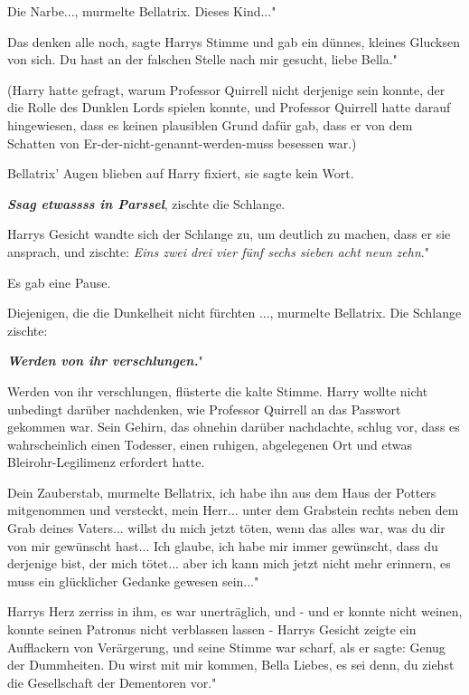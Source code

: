 \glqq{}Die Narbe...\grqq{}, murmelte Bellatrix. \glqq{}Dieses Kind..."

\glqq{}Das denken alle noch\grqq{}, sagte Harrys Stimme und gab ein dünnes,
kleines Glucksen von sich. \glqq{}Du hast an der falschen Stelle nach mir
gesucht, liebe Bella."

(Harry hatte gefragt, warum Professor Quirrell nicht derjenige sein konnte, der
die Rolle des Dunklen Lords spielen konnte, und Professor Quirrell hatte darauf
hingewiesen, dass es keinen plausiblen Grund dafür gab, dass er von dem Schatten
von Er-der-nicht-genannt-werden-muss besessen war.)

Bellatrix' Augen blieben auf Harry fixiert, sie sagte kein Wort.

\glqq{}\textbf{\emph{Ssag etwassss in Parssel}}\grqq{}, zischte die Schlange.

Harrys Gesicht wandte sich der Schlange zu, um deutlich zu machen, dass er sie
ansprach, und zischte: \glqq{}\emph{Eins zwei drei vier fünf sechs sieben acht
neun zehn}."

Es gab eine Pause.

\glqq{}Diejenigen, die die Dunkelheit nicht fürchten ...\grqq{}, murmelte
Bellatrix. Die Schlange zischte:

\glqq{}\textbf{\emph{Werden von ihr verschlungen.}}"

\glqq{}Werden von ihr verschlungen\grqq{}, flüsterte die kalte Stimme. Harry
wollte nicht unbedingt darüber nachdenken, wie Professor Quirrell an das
Passwort gekommen war. Sein Gehirn, das ohnehin darüber nachdachte, schlug vor,
dass es wahrscheinlich einen Todesser, einen ruhigen, abgelegenen Ort und etwas
Bleirohr-Legilimenz erfordert hatte.

\glqq{}Dein Zauberstab\grqq{}, murmelte Bellatrix, \glqq{}ich habe ihn aus dem
Haus der Potters mitgenommen und versteckt, mein Herr... unter dem Grabstein
rechts neben dem Grab deines Vaters... willst du mich jetzt töten, wenn das
alles war, was du dir von mir gewünscht hast... Ich glaube, ich habe mir immer
gewünscht, dass du derjenige bist, der mich tötet... aber ich kann mich jetzt
nicht mehr erinnern, es muss ein glücklicher Gedanke gewesen sein..."

Harrys Herz zerriss in ihm, es war unerträglich, und - und er konnte nicht
weinen, konnte seinen Patronus nicht verblassen lassen - Harrys Gesicht zeigte
ein Aufflackern von Verärgerung, und seine Stimme war scharf, als er sagte:
\glqq{}Genug der Dummheiten. Du wirst mit mir kommen, Bella Liebes, es sei denn,
du ziehst die Gesellschaft der Dementoren vor."

